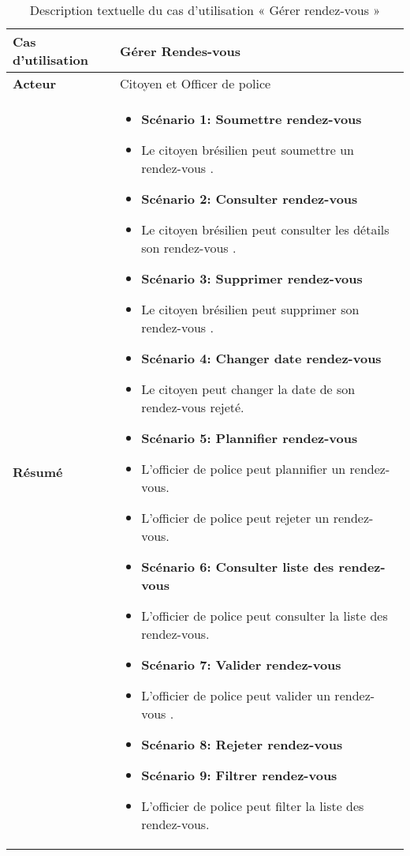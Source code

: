 \begin{longtable}{|>{\arraybackslash}p{4.2cm}|>{\arraybackslash}p{12.5cm}|}
\caption{\centering Description textuelle du cas d'utilisation « Gérer rendez-vous »}
\label{tab:backlog} \\
\hline
\textbf{Cas d'utilisation} & Gérer Rendes-vous \\
\hline
\endfirsthead

\hline
\endhead

\hline
\endfoot

\hline \hline
\endlastfoot
\textbf{Acteur}  & Citoyen et Officer de police\\
\hline
\textbf{Résumé} &
\begin{itemize}[label=]
\item\textbf{Scénario 1: Soumettre rendez-vous  }
  \item Le citoyen brésilien peut soumettre un rendez-vous .
  \item\textbf{Scénario 2: Consulter rendez-vous }
  \item Le citoyen brésilien peut consulter les détails son rendez-vous .
  \item\textbf{Scénario 3: Supprimer rendez-vous }
  \item Le citoyen brésilien peut supprimer son rendez-vous .
  \item\textbf{Scénario 4: Changer date rendez-vous}
  \item Le citoyen peut changer la date de son rendez-vous rejeté.
  \item\textbf{Scénario 5: Plannifier rendez-vous }
  \item L'officier de police peut plannifier un rendez-vous.
    \item L'officier de police peut rejeter un rendez-vous.
\item\textbf{Scénario 6: Consulter liste des rendez-vous}
  \item L'officier de police peut consulter la liste des rendez-vous.
   \item\textbf{Scénario 7: Valider rendez-vous }
  \item L'officier de police peut valider un rendez-vous .
   \item\textbf{Scénario 8: Rejeter rendez-vous}
    \item\textbf{Scénario 9: Filtrer rendez-vous}
  \item L'officier de police peut filter la liste des rendez-vous.


\end{itemize} \\



\end{longtable}
